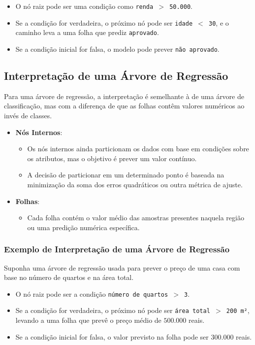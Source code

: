 \documentclass{sciposter}
\begin{document}
\begin{multicols}{3}
\begin{itemize}
    \item O nó raiz pode ser uma condição como \texttt{renda $>$ 50.000}.
    \item Se a condição for verdadeira, o próximo nó pode ser \texttt{idade $<$ 30}, e o caminho leva a uma folha que prediz \texttt{aprovado}.
    \item Se a condição inicial for falsa, o modelo pode prever \texttt{não aprovado}.
\end{itemize}

\subsection{Interpretação de uma Árvore de Regressão}

Para uma árvore de regressão, a interpretação é semelhante à de uma árvore de classificação, mas com a diferença de que as folhas contêm valores numéricos ao invés de classes.

\begin{itemize}
    \item \textbf{Nós Internos}:
    \begin{itemize}
        \item Os nós internos ainda particionam os dados com base em condições sobre os atributos, mas o objetivo é prever um valor contínuo.
        \item A decisão de particionar em um determinado ponto é baseada na minimização da soma dos erros quadráticos ou outra métrica de ajuste.
    \end{itemize}
    
    \item \textbf{Folhas}:
    \begin{itemize}
        \item Cada folha contém o valor médio das amostras presentes naquela região ou uma predição numérica específica.
    \end{itemize}
\end{itemize}

\subsubsection{Exemplo de Interpretação de uma Árvore de Regressão}

Suponha uma árvore de regressão usada para prever o preço de uma casa com base no número de quartos e na área total.

\begin{itemize}
    \item O nó raiz pode ser a condição \texttt{número de quartos $>$ 3}.
    \item Se a condição for verdadeira, o próximo nó pode ser \texttt{área total $>$ 200 m²}, levando a uma folha que prevê o preço médio de $500.000$ reais.
    \item Se a condição inicial for falsa, o valor previsto na folha pode ser $300.000$ reais.
\end{itemize}


\end{multicols}
\end{document}
